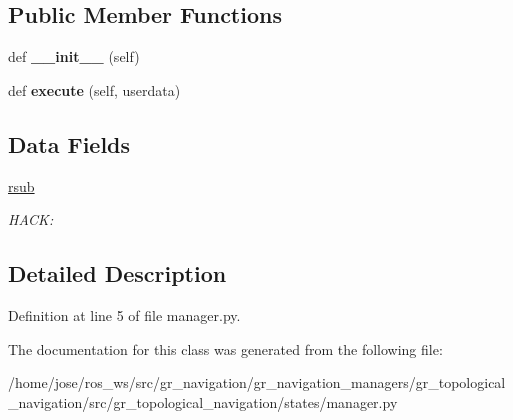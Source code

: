 \subsection*{Public Member Functions}
\begin{DoxyCompactItemize}
\item 
\mbox{\label{classgr__topological__navigation_1_1states_1_1manager_1_1Manager_a91861f7e96f685bd14a9483b4cdca5d8}} 
def {\bfseries \+\_\+\+\_\+init\+\_\+\+\_\+} (self)
\item 
\mbox{\label{classgr__topological__navigation_1_1states_1_1manager_1_1Manager_aad8d09e032863827b9a914650097e667}} 
def {\bfseries execute} (self, userdata)
\end{DoxyCompactItemize}
\subsection*{Data Fields}
\begin{DoxyCompactItemize}
\item 
\mbox{\label{classgr__topological__navigation_1_1states_1_1manager_1_1Manager_ab4672ab015eb022b8c8163743d8ea5a1}} 
\hyperlink{classgr__topological__navigation_1_1states_1_1manager_1_1Manager_ab4672ab015eb022b8c8163743d8ea5a1}{rsub}
\begin{DoxyCompactList}\small\item\em H\+A\+CK\+: \end{DoxyCompactList}\end{DoxyCompactItemize}


\subsection{Detailed Description}


Definition at line 5 of file manager.\+py.



The documentation for this class was generated from the following file\+:\begin{DoxyCompactItemize}
\item 
/home/jose/ros\+\_\+ws/src/gr\+\_\+navigation/gr\+\_\+navigation\+\_\+managers/gr\+\_\+topological\+\_\+navigation/src/gr\+\_\+topological\+\_\+navigation/states/manager.\+py\end{DoxyCompactItemize}
